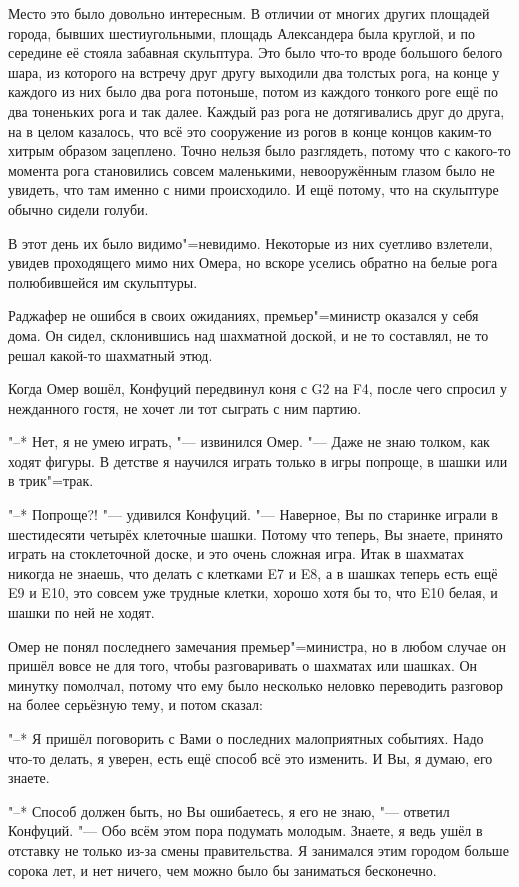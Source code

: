 Место это было довольно интересным.
В отличии от многих других площадей города, бывших шестиугольными, площадь
Александера была круглой, и по середине её стояла забавная скульптура.
Это было что-то вроде большого белого шара, из которого на встречу друг другу
выходили два толстых рога, на конце у каждого из них было два рога потоньше,
потом из каждого тонкого роге ещё по два тоненьких рога и так далее.
Каждый раз рога не дотягивались друг до друга, на в целом казалось, что всё это
сооружение из рогов в конце концов каким-то хитрым образом зацеплено.
Точно нельзя было разглядеть, потому что с какого-то момента рога становились
совсем маленькими, невооружённым глазом было не увидеть, что там именно с ними
происходило.
И ещё потому, что на скульптуре обычно сидели голуби.

В этот день их было видимо"=невидимо.
Некоторые из них суетливо взлетели, увидев проходящего мимо них Омера, но вскоре
уселись обратно на белые рога полюбившейся им скульптуры.

Раджафер не ошибся в своих ожиданиях, премьер"=министр оказался у себя дома.
Он сидел, склонившись над шахматной доской, и не то составлял, не то решал
какой-то шахматный этюд.

Когда Омер вошёл, Конфуций передвинул коня с G2 на F4, после чего спросил у
нежданного гостя, не хочет ли тот сыграть с ним партию.

"--* Нет, я не умею играть, "--- извинился Омер.
"--- Даже не знаю толком, как ходят фигуры.
В детстве я научился играть только в игры попроще, в шашки или в трик"=трак.

"--* Попроще?! "--- удивился Конфуций.
"--- Наверное, Вы по старинке играли в шестидесяти четырёх клеточные шашки.
Потому что теперь, Вы знаете, принято играть на стоклеточной доске, и это очень
сложная игра.
Итак в шахматах никогда не знаешь, что делать с клетками E7 и E8, а в шашках
теперь есть ещё E9 и E10, это совсем уже трудные клетки, хорошо хотя бы то, что
E10 белая, и шашки по ней не ходят.

Омер не понял последнего замечания премьер"=министра, но в любом случае он
пришёл вовсе не для того, чтобы разговаривать о шахматах или шашках.
Он минутку помолчал, потому что ему было несколько неловко переводить разговор
на более серьёзную тему, и потом сказал:

"--* Я пришёл поговорить с Вами о последних малоприятных событиях.
Надо что-то делать, я уверен, есть ещё способ всё это изменить.
И Вы, я думаю, его знаете.

"--* Способ должен быть, но Вы ошибаетесь, я его не знаю, "--- ответил
Конфуций.
"--- Обо всём этом пора подумать молодым.
Знаете, я ведь ушёл в отставку не только из-за смены правительства.
Я занимался этим городом больше сорока лет, и нет ничего, чем можно было бы
заниматься бесконечно.

